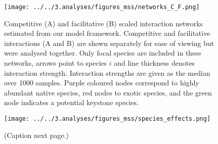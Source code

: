 \documentclass[a4,12pt]{article}
\begin{document}
    \begin{figure}[H]
        \begin{centering}
        \texttt{[image: ../../3.analyses/figures\_mss/networks\_C\_F.png]}
        \caption{Competitive (A) and facilitative (B) scaled interaction networks estimated from our model framework. Competitive and facilitative interactions (A and B) are shown separately for ease of viewing but were analysed together. Only focal species are included in these networks, arrows point to species $i$ and line thickness denotes interaction strength. Interaction strengths are given as the median over 1000 samples. Purple coloured nodes correspond to highly abundant native species, red nodes to exotic species, and the green node indicates a potential keystone species.}
        \label{fig:netwks}
       \end{centering}
    \end{figure}  


    \begin{figure}[H]
        \begin{centering}
        \texttt{[image: ../../3.analyses/figures\_mss/species\_effects.png]}
        \caption{(Caption next page.)}
        \label{fig:species}
        \end{centering}
    \end{figure} 
\end{document}
